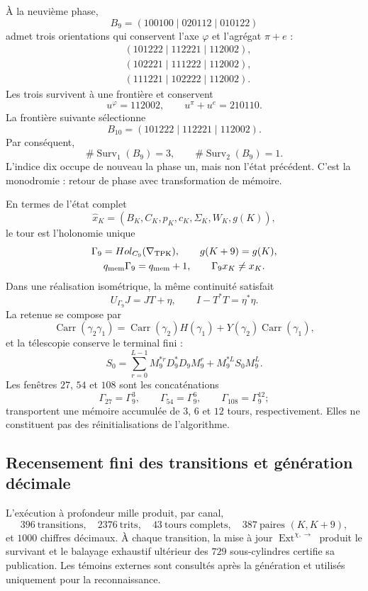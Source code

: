 À la neuvième phase,
\[
 B_9=(100100\mid020112\mid010122)
\]
admet trois orientations qui conservent l'axe \(\varphi\) et l'agrégat
\(\pi+e\) :
\[
\begin{aligned}
 &(101222\mid112221\mid112002),\\
 &(102221\mid111222\mid112002),\\
 &(111221\mid102222\mid112002).
\end{aligned}
\]
Les trois survivent à une frontière et conservent
\[
 u^{\varphi}=112002,
 \qquad u^\pi+u^e=210110.
\]
La frontière suivante sélectionne
\[
 B_{10}=(101222\mid112221\mid112002).
\]
Par conséquent,
\[
 \#\operatorname{Surv}_1(B_9)=3,
 \qquad
 \#\operatorname{Surv}_2(B_9)=1.
\]
L'indice dix occupe de nouveau la phase un, mais non l'état précédent. C'est
la monodromie : retour de phase avec transformation de mémoire.

En termes de l'état complet
\[
 \widehat x_K=(B_K,C_K,p_K,c_K,\Sigma_K,W_K,g(K)),
\]
le tour est l'holonomie unique
\[
 \begin{gathered}
 \Gamma_9=\operatorname{Hol}_{C_9}(\nabla_{\rm TPK}),
 \qquad g(K+9)=g(K),\\
 q_{\rm mem}\Gamma_9=q_{\rm mem}+1,
 \qquad \Gamma_9\widehat x_K\ne\widehat x_K.
 \end{gathered}
\]
Dans une réalisation isométrique, la même continuité satisfait
\[
 U_{\Gamma_9}J=JT+\eta,\qquad
 I-T^*T=\eta^*\eta.
\]
La retenue se compose par
\[
 \operatorname{Carr}(\gamma_2\gamma_1)
 =\operatorname{Carr}(\gamma_2)H(\gamma_1)
 +Y(\gamma_2)\operatorname{Carr}(\gamma_1),
\]
et la télescopie conserve le terminal fini :
\[
 S_0=\sum_{r=0}^{L-1}M_9^{*r}D_9^*D_9M_9^r
     +M_9^{*L}S_0M_9^L.
\]
Les fenêtres \(27\), \(54\) et \(108\) sont les concaténations
\[
 \Gamma_{27}=\Gamma_9^3,\qquad
 \Gamma_{54}=\Gamma_9^6,\qquad
 \Gamma_{108}=\Gamma_9^{12};
\]
transportent une mémoire accumulée de \(3\), \(6\) et \(12\) tours,
respectivement. Elles ne constituent pas des réinitialisations de l'algorithme.

\subsection{Recensement fini des transitions et génération décimale}

L'exécution à profondeur mille produit, par canal,
\[
396\ \text{transitions},\quad
2376\ \text{trits},\quad
43\ \text{tours complets},\quad
387\ \text{paires }(K,K+9),
\]
et \(1000\) chiffres décimaux. À chaque transition, la mise à jour
\(\operatorname{Ext}^{\chi,\rightarrow}\) produit le survivant et le
balayage exhaustif ultérieur des \(729\) sous-cylindres certifie sa
publication. Les témoins externes sont consultés après la génération et
utilisés uniquement pour la reconnaissance.

